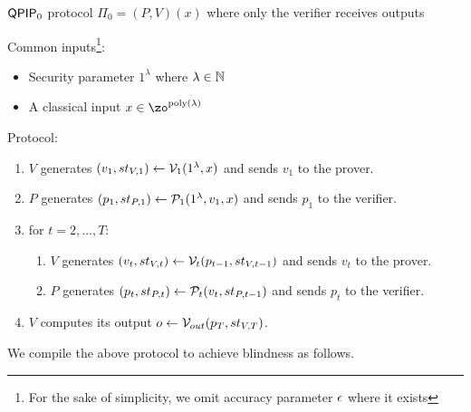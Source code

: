 \begin{protocol}{$\operatorname{\mathsf{QPIP}}_0$ protocol $\Pi_0=(P, V)(x)$ where only the verifier receives outputs}
	
	Common inputs\footnote{For the sake of simplicity, we omit accuracy parameter $\epsilon$ where it exists}:
	\begin{itemize}
		\item Security parameter $1^\lambda$ where $\lambda\in\mathbb{N}$
		\item A classical input $x\in\zo^{\poly(\lambda)}$
	\end{itemize}

    Protocol:
	\begin{enumerate}
		\item $V$ generates $(v_1, st_{V, 1})\leftarrow\mathcal{V}_1(1^\lambda, x)$ and sends $v_1$ to the prover.
		\item $P$ generates $(p_1, st_{P, 1})\leftarrow\mathcal{P}_1(1^\lambda, v_1, x)$ and sends $p_1$ to the verifier.
		\item for $t=2,\ldots,T$:
		\begin{enumerate}
			\item $V$ generates $(v_t, st_{V, t})\leftarrow\mathcal{V}_t(p_{t-1}, st_{V, t-1})$ and sends $v_t$ to the prover.
			\item $P$ generates $(p_t, st_{P, t})\leftarrow\mathcal{P}_t(v_t, st_{P, t-1})$ and sends $p_t$ to the verifier.
		\end{enumerate}
		\item $V$ computes its output $o\leftarrow\mathcal{V}_{out}(p_T, st_{V, T})$.
	\end{enumerate}

\end{protocol}

We compile the above protocol to achieve blindness as follows.

